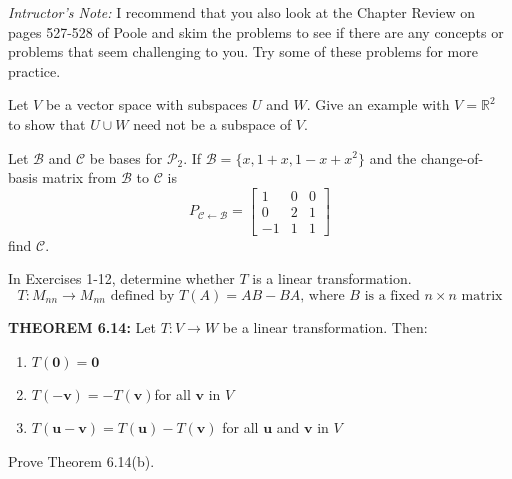 \documentclass[12pt,letterpaper]{hmcpset}
\newcommand{\RR}{\mathbb{R}}
\newcommand{\m}[1]{\begin{bmatrix} #1 \end{bmatrix}}
\begin{document}

\noindent
\emph{Intructor's Note:} I recommend that you also look at the Chapter Review on
pages 527-528 of Poole and skim the problems to see if there are any concepts or
problems that seem challenging to you. Try some of these problems for more
practice.

\begin{problem}[Poole 6.1.47]
    Let $V$ be a vector space with subspaces $U$ and $W$. Give an
    example with $V=\RR^2$ to show that $U\cup W$ need not be a
    subspace of $V$.
\end{problem}
\begin{solution}
    \vfill
\end{solution}
\newpage

\begin{problem}[Poole 6.3.16]
    Let $\mathcal{B}$ and $\mathcal{C}$ be bases for
    $\mathscr{P}_2$. If $\mathcal{B}=\{x,1+x,1-x+x^2\}$ and the
    change-of-basis matrix from $\mathcal{B}$ to $\mathcal{C}$ is
    \[
        P_{\mathcal{C}\leftarrow\mathcal{B}}=\m{1&0&0\\0&2&1\\-1&1&1}
    \]
    find $\mathcal{C}$.
\end{problem}
\begin{solution}
    \vfill
\end{solution}
\newpage

\begin{problem}[Poole 6.4.4]
    In Exercises 1-12, determine whether $T$ is a linear transformation.
    \[
        T:M_{nn}\to M_{nn}\text{ defined by }T(A)=AB-BA\text{, where }B
        \text{ is a fixed }n\times n\text{ matrix}
    \]
\end{problem}
\begin{solution}
    \vfill
\end{solution}
\newpage

\begin{problem}[Poole 6.4.21]
    \textbf{THEOREM 6.14:} Let $T:V\to W$ be a linear transformation. Then:
    \begin{enumerate}
        \item $T(\textbf{0})=\textbf{0}$
        \item $T(-\textbf{v})=-T(\textbf{v})$\quad for all $\textbf{v}$ in $V$
        \item $T(\textbf{u}-\textbf{v})=T(\textbf{u})-T(\textbf{v})$\quad
            for all $\textbf{u}$ and $\textbf{v}$ in $V$
    \end{enumerate}
    Prove Theorem 6.14(b).
\end{problem}
\begin{solution}
    \vfill
\end{solution}
\newpage
\end{document}
